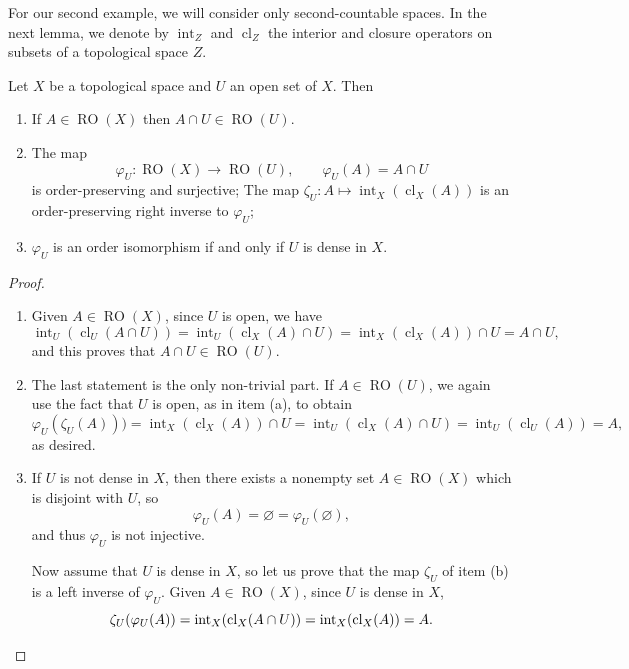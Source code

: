 For our second example, we will consider only second-countable spaces. In the next lemma, we denote by $\operatorname{int}_Z$ and $\operatorname{cl}_Z$ the interior and closure operators on subsets of a topological space $Z$.

\begin{lemma}\label{lemmamorphismregularopenofsubset}
	Let $X$ be a topological space and $U$ an open set of $X$. Then
	\begin{enumerate}
		\item[(a)] If $A\in\operatorname{RO}(X)$ then $A\cap U\in\operatorname{RO}(U)$.
		\item[(b)] The map \[\varphi_U:\operatorname{RO}(X)\to\operatorname{RO}(U),\qquad \varphi_U(A)=A\cap U\]
		is order-preserving and surjective; The map $\zeta_U:A\mapsto \operatorname{int}_X(\operatorname{cl}_X(A))$ is an order-preserving right inverse to $\varphi_U$;
		\item[(c)] $\varphi_U$ is an order isomorphism if and only if $U$ is dense in $X$.
	\end{enumerate}
\end{lemma}
\begin{proof}
	\begin{enumerate}
		\item[(a)] Given $A\in\operatorname{RO}(X)$, since $U$ is open, we have
		\[\operatorname{int}_U(\operatorname{cl}_U(A\cap U))=\operatorname{int}_U(\operatorname{cl}_X(A)\cap U)=\operatorname{int}_X(\operatorname{cl}_X(A))\cap U=A\cap U,\]
		and this proves that $A\cap U\in\operatorname{RO}(U)$.
		\item[(b)] The last statement is the only non-trivial part. If $A\in\operatorname{RO}(U)$, we again use the fact that $U$ is open, as in item (a), to obtain
		\[\varphi_U(\zeta_U(A)))=\operatorname{int}_X(\operatorname{cl}_X(A))\cap U=\operatorname{int}_U(\operatorname{cl}_X(A)\cap U)=\operatorname{int}_U(\operatorname{cl}_U(A))=A,\]
		as desired.
		\item[(c)] If $U$ is not dense in $X$, then there exists a nonempty set $A\in\operatorname{RO}(X)$ which is disjoint with $U$, so
		\[\varphi_U(A)=\varnothing=\varphi_U(\varnothing),\]
		and thus $\varphi_U$ is not injective.
		
		Now assume that $U$ is dense in $X$, so let us prove that the map $\zeta_U$ of item (b) is a left inverse of $\varphi_U$. Given $A\in\operatorname{RO}(X)$, since $U$ is dense in $X$,
		\[\zeta_U(\varphi_U(A))=\operatorname{int}_X(\operatorname{cl}_X(A\cap U))=\operatorname{int}_X(\operatorname{cl}_X(A))=A.\qedhere\]
	\end{enumerate}
\end{proof}

